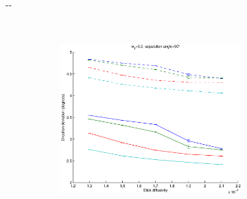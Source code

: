 \documentclass{article}
\begin{document}
\begin{figure}[H]
\begin{adjustwidth}{-\oddsidemargin}{-\rightmargin}
\begin{subfigure}{0.8\paperwidth}
\begin{subfigure}{0.3\textwidth}
      \end{subfigure}
      ~
      \begin{subfigure}{0.3\textwidth}
        \centering
        \includegraphics[width=\textwidth]{figures/synth_bas_diffus__snr=20__w1=2__angle=90.eps}
      \end{subfigure}
    \end{subfigure}
    

\end{adjustwidth}
\end{figure}
\end{document}
